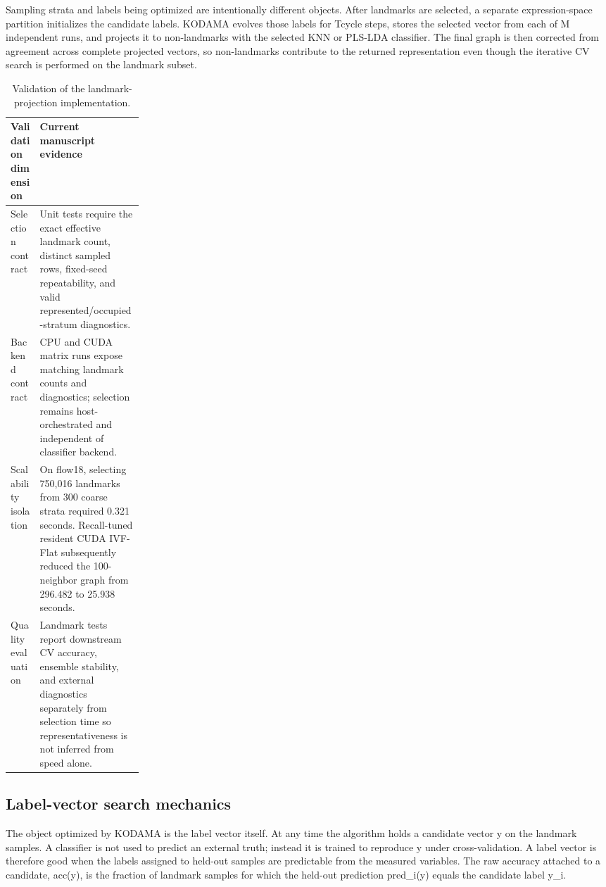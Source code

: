 \documentclass[twoside,11pt]{article}
\begin{document}
Sampling strata and labels being optimized are intentionally different objects. After landmarks are selected, a separate expression-space partition initializes the candidate labels. KODAMA evolves those labels for Tcycle steps, stores the selected vector from each of M independent runs, and projects it to non-landmarks with the selected KNN or PLS-LDA classifier. The final graph is then corrected from agreement across complete projected vectors, so non-landmarks contribute to the returned representation even though the iterative CV search is performed on the landmark subset.

\begin{table}[h]
\caption{Validation of the landmark-projection implementation.}
\small
\begin{tabularx}{\linewidth}{p{0.22\linewidth}X}
\toprule
Validation dimension & Current manuscript evidence \\
\midrule
Selection contract & Unit tests require the exact effective landmark count, distinct sampled rows, fixed-seed repeatability, and valid represented/occupied-stratum diagnostics. \\
Backend contract & CPU and CUDA matrix runs expose matching landmark counts and diagnostics; selection remains host-orchestrated and independent of classifier backend. \\
Scalability isolation & On flow18, selecting 750,016 landmarks from 300 coarse strata required 0.321 seconds. Recall-tuned resident CUDA IVF-Flat subsequently reduced the 100-neighbor graph from 296.482 to 25.938 seconds. \\
Quality evaluation & Landmark tests report downstream CV accuracy, ensemble stability, and external diagnostics separately from selection time so representativeness is not inferred from speed alone. \\
\bottomrule
\end{tabularx}
\end{table}

\subsection{Label-vector search mechanics}
The object optimized by KODAMA is the label vector itself. At any time the algorithm holds a candidate vector y on the landmark samples. A classifier is not used to predict an external truth; instead it is trained to reproduce y under cross-validation. A label vector is therefore good when the labels assigned to held-out samples are predictable from the measured variables. The raw accuracy attached to a candidate, acc(y), is the fraction of landmark samples for which the held-out prediction pred\_i(y) equals the candidate label y\_i.
\end{document}
